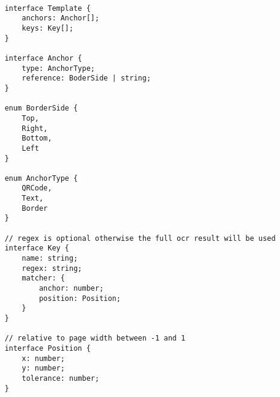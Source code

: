 \documentclass[../ockr-specification.tex]{subfiles}
\begin{document}
\begin{lstlisting}
    
    interface Template {
        anchors: Anchor[];
        keys: Key[];
    }

    interface Anchor {
        type: AnchorType;
        reference: BoderSide | string;
    }

    enum BorderSide {
        Top,
        Right,
        Bottom,
        Left
    }

    enum AnchorType {
        QRCode,
        Text,
        Border
    }

    // regex is optional otherwise the full ocr result will be used
    interface Key {
        name: string;
        regex: string;
        matcher: {
            anchor: number;
            position: Position;
        } 
    }

    // relative to page width between -1 and 1
    interface Position {
        x: number;
        y: number;
        tolerance: number;
    }
    
\end{lstlisting}
\newpage
\end{document}
